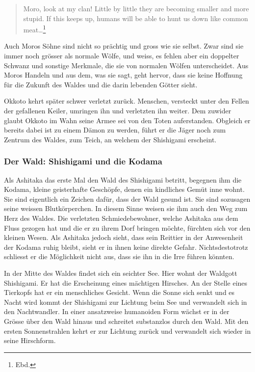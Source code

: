 \begin{quote}
\glqq Moro, look at my clan! Little by little they are becoming smaller and more stupid. If this keeps up, humans will be able to hunt us down like common meat\dots\grqq \footnote{Ebd.}
\end{quote}

Auch Moros Söhne sind nicht so prächtig und gross wie sie selbst. Zwar sind sie immer noch grösser als normale Wölfe, und weiss, es fehlen aber ein doppelter Schwanz und sonstige Merkmale, die sie von normalen Wölfen unterscheidet. Aus Moros Handeln und aus dem, was sie sagt, geht hervor, dass sie keine Hoffnung für die Zukunft des Waldes und die darin lebenden Götter sieht. 

Okkoto kehrt später schwer verletzt zurück. Menschen, versteckt unter den Fellen der gefallenen Keiler, umringen ihn und verletzten ihn weiter. Dem zuwider glaubt Okkoto im Wahn seine Armee sei von den Toten auferstanden. Obgleich er bereits dabei ist zu einem Dämon zu werden, führt er die Jäger noch zum Zentrum des Waldes, zum Teich, an welchem der Shishigami erscheint.  

\subsubsection*{Der Wald: Shishigami und die Kodama} 
Als Ashitaka das erste Mal den Wald des Shishigami betritt, begegnen ihm die Kodama, kleine geisterhafte Geschöpfe, denen ein kindliches Gemüt inne wohnt. Sie sind eigentlich ein Zeichen dafür, dass der Wald gesund ist. Sie sind sozusagen seine weissen Blutkörperchen. In diesem Sinne weisen sie ihm auch den Weg zum Herz des Waldes. Die verletzten Schmiedebewohner, welche Ashitaka aus dem Fluss gezogen hat und die er zu ihrem Dorf bringen möchte, fürchten sich vor den kleinen Wesen. Als Ashitaka jedoch sieht, dass sein Reittier in der Anwesenheit der Kodama ruhig bleibt, sieht er in ihnen keine direkte Gefahr. Nichtsdestotrotz schliesst er die Möglichkeit nicht aus, dass sie ihn in die Irre führen könnten. 

In der Mitte des Waldes findet sich ein seichter See. Hier wohnt der Waldgott Shishigami. Er hat die Erscheinung eines mächtigen Hirsches. An der Stelle eines Tierkopfs hat er ein menschliches Gesicht. Wenn die Sonne sich senkt und es Nacht wird kommt der Shishigami zur Lichtung beim See und verwandelt sich in den Nachtwandler. In einer ansatzweise humanoiden Form wächst er in der Grösse über den Wald hinaus und schreitet substanzlos durch den Wald. Mit den ersten Sonnenstrahlen kehrt er zur Lichtung zurück und verwandelt sich wieder in seine Hirschform. 

